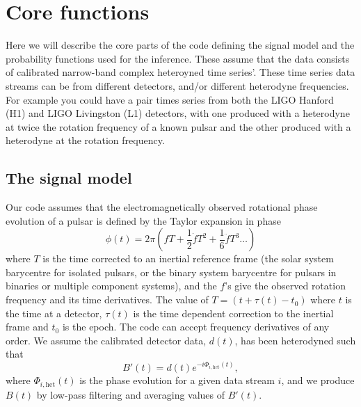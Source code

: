 \section{Core functions}

Here we will describe the core parts of the code defining the signal model and the probability functions used
for the inference. These assume that the data consists of calibrated narrow-band complex heteroyned time
series'. These time series data streams can be from different detectors, and/or different heterodyne
frequencies. For example you could have a pair times series from both the LIGO Hanford (H1) and LIGO
Livingston (L1) detectors, with one produced with a heterodyne at twice the rotation frequency of a known
pulsar and the other produced with a heterodyne at the rotation frequency.

\subsection{The signal model}\label{sec:model}

Our code assumes that the electromagnetically observed rotational phase evolution of a pulsar is defined by the Taylor expansion in phase
\begin{equation}
\phi(t) = 2\pi\left(fT + \frac{1}{2}\dot{f}T^2 + \frac{1}{6}\ddot{f}T^3 \ldots \right)
\end{equation}
where $T$ is the time corrected to an inertial reference frame (the solar system barycentre
for isolated pulsars, or the binary system barycentre for pulsars in binaries or multiple component systems), and the $f$'s give
the observed rotation frequency and its time derivatives. The value of $T = (t+\tau(t)-t_0)$ where $t$ is the
time at a detector, $\tau(t)$ is the time dependent correction to the inertial frame and $t_0$ is the epoch.
The code can accept frequency derivatives of any order. We assume the
calibrated detector data, $d(t)$, has been heterodyned such that
\begin{equation}
B'(t) = d(t)e^{-i\Phi_{i,\text{het}}(t)},
\end{equation}
where $\Phi_{i,\text{het}}(t)$ is the phase evolution for a given data stream $i$, and we produce $B(t)$ by
low-pass filtering and averaging values of $B'(t)$.

